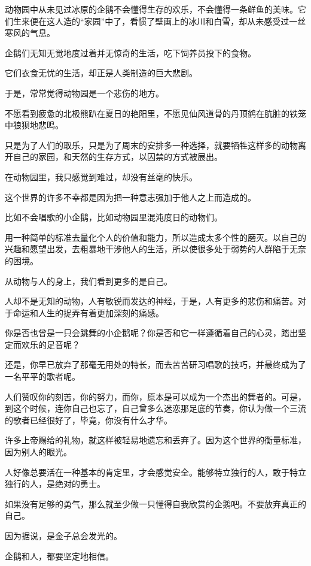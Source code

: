 \documentclass[12pt,a4paper]{article}
\def\blankrev{\vspace{1ex}}									%
\begin{document}
		\blankrev
		动物园中从未见过冰原的企鹅不会懂得生存的欢乐，不会懂得一条鲜鱼的美味。它们生来便在这人造的“家园”中了，看惯了壁画上的冰川和白雪，却从未感受过一丝寒风的气息。\par
		企鹅们无知无觉地度过着并无惊奇的生活，吃下饲养员投下的食物。\par
		它们衣食无忧的生活，却正是人类制造的巨大悲剧。\par
		于是，常常觉得动物园是一个悲伤的地方。\par
		不愿看到疲惫的北极熊趴在夏日的艳阳里，不愿见仙风道骨的丹顶鹤在肮脏的铁笼中狼狈地悲鸣。\par
		只是为了人们的取乐，只是为了周末的安排多一种选择，就要牺牲这样多的动物离开自己的家园，和天然的生存方式，以囚禁的方式被展出。\par
		在动物园里，我只感觉到难过，却没有丝毫的快乐。

		\blankrev
		这个世界的许多不幸都是因为把一种意志强加于他人之上而造成的。\par
		比如不会唱歌的小企鹅，比如动物园里混沌度日的动物们。\par
		用一种简单的标准去量化个人的价值和能力，所以造成太多个性的磨灭。以自己的兴趣和愿望出发，去粗暴地干涉他人的生活，所以使很多处于弱势的人群陷于无奈的困境。\par
		从动物与人的身上，我们看到更多的是自己。\par
		人却不是无知的动物，人有敏锐而发达的神经，于是，人有更多的悲伤和痛苦。对于命运和人生的捉弄有着更加深刻的痛感。

		\blankrev
		你是否也曾是一只会跳舞的小企鹅呢？你是否和它一样遵循着自己的心灵，踏出坚定而欢乐的足音呢？\par
		还是，你早已放弃了那毫无用处的特长，而去苦苦研习唱歌的技巧，并最终成为了一名平平的歌者呢。\par
		人们赞叹你的刻苦，你的努力，而你，原本是可以成为一个杰出的舞者的。可是，到这个时候，连你自己也忘了，自己曾多么迷恋那足底的节奏，你认为做一个三流的歌者已经很好了，毕竟，你没有什么才华。\par
		许多上帝赐给的礼物，就这样被轻易地遗忘和丢弃了。因为这个世界的衡量标准，因为别人的眼光。\par
		人好像总要活在一种基本的肯定里，才会感觉安全。能够特立独行的人，敢于特立独行的人，是绝对的勇士。\par
		如果没有足够的勇气，那么就至少做一只懂得自我欣赏的企鹅吧。不要放弃真正的自己。\par
		因为据说，是金子总会发光的。\par
		企鹅和人，都要坚定地相信。
\end{document}
